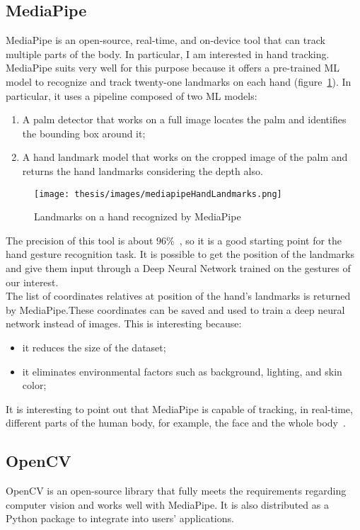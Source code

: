 \documentclass[../thesis.tex]{subfiles}
\begin{document}
\subsection{MediaPipe}\label{sec:mediapipe}
MediaPipe is an open-source, real-time, and on-device tool that can track multiple parts of the body. In particular, I am interested in hand tracking. MediaPipe suits very well for this purpose because it offers a pre-trained \acrshort{ML} model to recognize and track twenty-one landmarks on each hand (figure~\ref{fig:landmarksMediapipe}). In particular, it uses a pipeline composed of two \acrshort{ML} models:
\begin{enumerate}
    \item A palm detector that works on a full image locates the palm and identifies the bounding box around it;
    \item A hand landmark model that works on the cropped image of the palm and returns the hand landmarks considering the depth also. 
\end{enumerate}
\begin{figure}[H]
    \centering
    \texttt{[image: thesis/images/mediapipeHandLandmarks.png]}
    \caption{Landmarks on a hand recognized by MediaPipe~\cite{site:mediapipe}}
    \label{fig:landmarksMediapipe}
\end{figure}
The precision of this tool is about $96\%$~\cite{paper:mediapipe}, so it is a good starting point for the hand gesture recognition task. It is possible to get the position of the landmarks and give them input through a Deep Neural Network trained on the gestures of our interest. \\
The list of coordinates relatives at position of the hand's landmarks is returned by MediaPipe.These coordinates can be saved and used to train a deep neural network instead of images. This is interesting because: 
\begin{itemize}
    \item it reduces the size of the dataset;
    \item it eliminates environmental factors such as background, lighting, and skin color;
\end{itemize}

It is interesting to point out that MediaPipe is capable of tracking, in real-time, different parts of the human body, for example, the face and the whole body~\cite{site:mediapipe}.

\subsection{OpenCV}
OpenCV is an open-source library that fully meets the requirements regarding computer vision and works well with MediaPipe. It is also distributed as a Python package to integrate into users' applications. 
\end{document}
